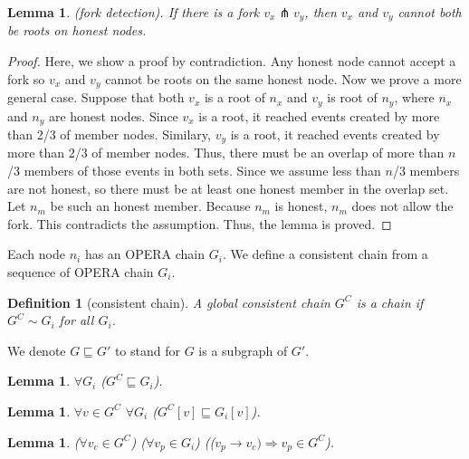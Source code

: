 \documentclass{article}
\newtheorem{lem}[thm]{Lemma}
\newtheorem{defn}{Definition}[section]
\newcommand{\efork}{\pitchfork}
\newcommand{\hbefore}{\rightarrow}
\begin{document}
\begin{lem} (fork detection). If there is a fork $v_x \efork  v_y$, then $v_x$ and $v_y$ cannot both be roots on honest nodes.
\end{lem}
\begin{proof}
	Here, we show a proof by contradiction. Any honest node cannot accept a fork so $v_x$ and $v_y$ cannot be roots on the same honest node. Now we prove a more general case. Suppose that both $v_x$ is a root of $n_x$ and $v_y$ is root of $n_y$, where $n_x$ and $n_y$ are honest nodes. Since $v_x$ is a root, it reached events created by more than 2/3 of member nodes. Similary, $v_y$ is a root, it reached events created by  more than 2/3 of member nodes. Thus, there must be an overlap of more than $n$/3 members of those events in both sets. Since we assume less than $n$/3 members are not honest, so there must be at least one honest member in the overlap set. Let $n_m$ be such an honest member. Because $n_m$ is honest, $n_m$ does not allow the fork. This contradicts the assumption. Thus, the lemma is proved.
\end{proof}



Each node $n_i$ has an OPERA chain $G_i$. We define a consistent chain from a sequence of OPERA chain $G_i$.
\begin{defn}[consistent chain] 
	A global consistent chain $G^C$ is a chain if $G^C \sim G_i$ for all $G_i$.
\end{defn}

We denote $G \sqsubseteq G'$ to stand for $G$ is a subgraph of $G'$.
\begin{lem}
	$\forall G_i$ ($G^C \sqsubseteq G_i$).
\end{lem}
\begin{lem}
	$\forall v \in G^C$ $\forall G_i$ ($G^C[v] \sqsubseteq G_i[v]$).
\end{lem}
\begin{lem}
	($\forall v_c \in G^C$) ($\forall v_p \in G_i$) (($v_p \hbefore v_c) \Rightarrow v_p \in G^C$).
\end{lem}
\end{document}
